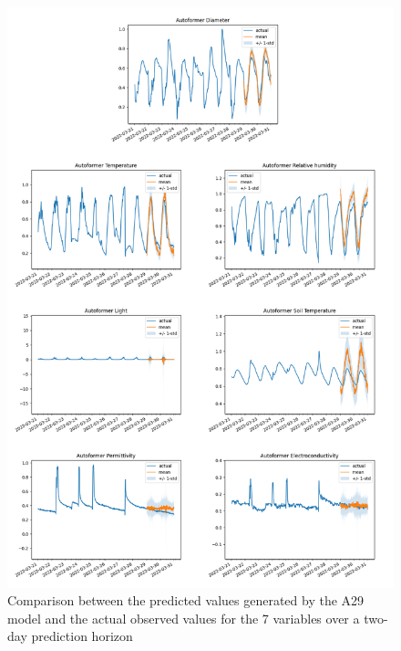 \begin{figure}[htbp]
    \centering
    \includegraphics[width=15 cm]{6_ChapterResults/figuras/A29.png}
    \caption{Comparison between the predicted values generated by the A29 model and the actual observed values for the 7 variables over a two-day prediction horizon}
    \label{A29}
\end{figure}